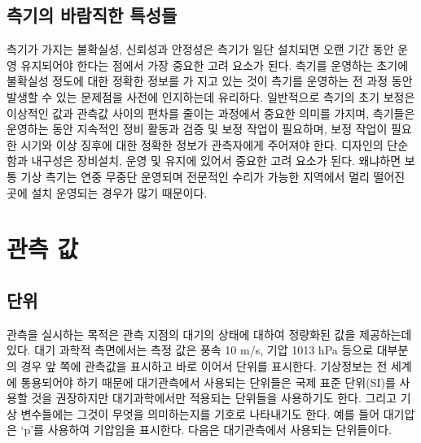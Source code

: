 \subsection{측기의 바람직한 특성들}

측기가 가지는 불확실성, 신뢰성과 안정성은 측기가 일단 설치되면 오랜 기간 동안 운영 유지되어야 한다는 점에서 가장 중요한 고려 요소가 된다. 측기를 운영하는 초기에 불확실성 정도에 대한 정확한 정보를 가
지고 있는 것이 측기를 운영하는 전 과정 동안 발생할 수 있는 문제점을 사전에 인지하는데 유리하다.
일반적으로 측기의 초기 보정은 이상적인 값과 관측값 사이의 편차를 줄이는 과정에서 중요한 의미를 가지며, 측기들은 운영하는 동안 지속적인 정비 활동과 검증 및 보정 작업이 필요하며, 보정 작업이 필요한 시기와 이상 징후에 대한 정확한 정보가 관측자에게 주어져야 한다.
디자인의 단순함과 내구성은 장비설치, 운영 및 유지에 있어서 중요한 고려 요소가 된다. 왜냐하면 보통 기상 측기는 연중 무중단 운영되며 전문적인 수리가 가능한 지역에서 멀리 떨어진 곳에 설치 운영되는 경우가 많기 때문이다.

\section{관측 값}

\subsection{단위}

관측을 실시하는 목적은 관측 지점의 대기의 상태에 대하여 정량화된 값을 제공하는데 있다. 대기 과학적 측면에서는 측정 값은 풍속 10 m/s, 기압 1013 hPa 등으로 대부분의 경우 앞 쪽에 관측값을 표시하고 바로 이어서 단위를 표시한다.
기상정보는 전 세계에 통용되어야 하기 때문에 대기관측에서 사용되는 단위들은 국제 표준 단위(SI)를 사용할 것을 권장하지만 대기과학에서만 적용되는 단위들을 사용하기도 한다. 그리고 기상 변수들에는 그것이 무엇을 의미하는지를 기호로 나타내기도 한다. 예를 들어 대기압은 ‘p’를 사용하여 기압임을 표시한다. 다음은 대기관측에서 사용되는 단위들이다.

